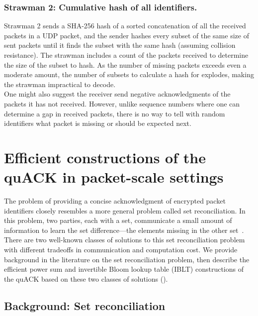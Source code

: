 \subsubsection{Strawman 2: Cumulative hash of all identifiers.}
Strawman 2 sends a SHA-256 hash of a sorted concatenation of all the received
packets in a UDP packet, and the sender hashes every subset of the same size of
sent packets until it finds the subset with the same hash (assuming collision
resistance). The strawman includes a count of the packets received to determine
the size of the subset to hash. As the number of missing packets exceeds even a
moderate amount, the number of subsets to calculate a hash for explodes, making
the strawman impractical to decode.\\

\noindent
One might also suggest the receiver send negative acknowledgments of the packets
it has not received. However, unlike sequence numbers where one can
determine a gap in received packets, there is no way to tell with random
identifiers what packet is missing or should be expected next.

\section{Efficient constructions of the quACK in packet-scale settings}
\label{sec:quack:constructions}

The problem of providing a concise acknowledgment of encrypted packet
identifiers closely resembles a more general problem called set reconciliation.
In this problem, two parties, each with a set, communicate a small amount of
information to learn the set difference---the elements missing in the other
set~\cite{minsky2003set,eppstein2011straggler}. There are two well-known classes
of solutions to this set reconciliation problem with different tradeoffs
in communication and computation cost.
We provide background in the literature on the set reconciliation problem,
then describe the efficient power sum and invertible Bloom lookup table (IBLT)
constructions of the quACK based on these two classes of solutions
().



\subsection{Background: Set reconciliation}
\label{sec:quack:constructions:background}

